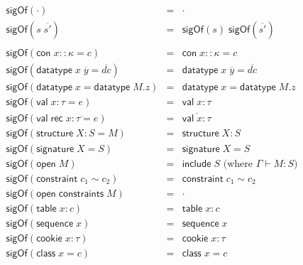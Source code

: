 \documentclass{article}
\newcommand{\mt}[1]{\mathsf{#1}}
\begin{document}
\begin{eqnarray*}
  \mt{sigOf}(\cdot) &=& \cdot \\
  \mt{sigOf}(s \; \overline{s'}) &=& \mt{sigOf}(s) \; \mt{sigOf}(\overline{s'}) \\
  \\
  \mt{sigOf}(\mt{con} \; x :: \kappa = c) &=& \mt{con} \; x :: \kappa = c \\
  \mt{sigOf}(\mt{datatype} \; x \; \overline{y} = \overline{dc}) &=& \mt{datatype} \; x \; \overline{y} = \overline{dc} \\
  \mt{sigOf}(\mt{datatype} \; x = \mt{datatype} \; M.z) &=& \mt{datatype} \; x = \mt{datatype} \; M.z \\
  \mt{sigOf}(\mt{val} \; x : \tau = e) &=& \mt{val} \; x : \tau \\
  \mt{sigOf}(\mt{val} \; \mt{rec} \; \overline{x : \tau = e}) &=& \overline{\mt{val} \; x : \tau} \\
  \mt{sigOf}(\mt{structure} \; X : S = M) &=& \mt{structure} \; X : S \\
  \mt{sigOf}(\mt{signature} \; X = S) &=& \mt{signature} \; X = S \\
  \mt{sigOf}(\mt{open} \; M) &=& \mt{include} \; S \textrm{ (where $\Gamma \vdash M : S$)} \\
  \mt{sigOf}(\mt{constraint} \; c_1 \sim c_2) &=& \mt{constraint} \; c_1 \sim c_2 \\
  \mt{sigOf}(\mt{open} \; \mt{constraints} \; M) &=& \cdot \\
  \mt{sigOf}(\mt{table} \; x : c) &=& \mt{table} \; x : c \\
  \mt{sigOf}(\mt{sequence} \; x) &=& \mt{sequence} \; x \\
  \mt{sigOf}(\mt{cookie} \; x : \tau) &=& \mt{cookie} \; x : \tau \\
  \mt{sigOf}(\mt{class} \; x = c) &=& \mt{class} \; x = c \\
\end{eqnarray*}
\end{document}
